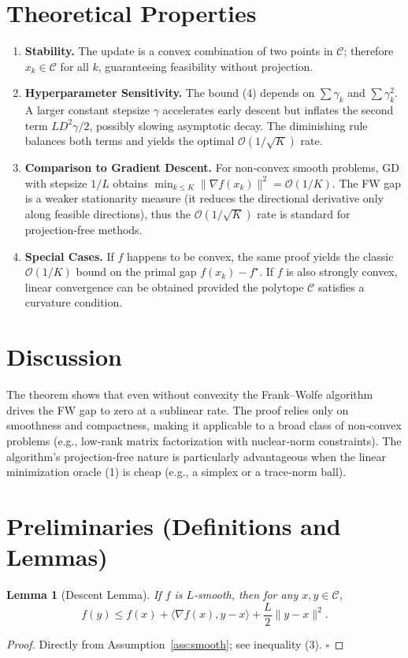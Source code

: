 \documentclass{article}
\newtheorem{lemma}{Lemma}
\newcommand{\grad}{\nabla}
\newcommand{\dom}{\mathcal{C}}
\begin{document}
\section*{Theoretical Properties}
\begin{enumerate}[label=\arabic*.]
\item \textbf{Stability.} The update is a convex combination of two points in $\dom$; therefore $x_{k}\in\dom$ for all $k$, guaranteeing feasibility without projection.
\item \textbf{Hyperparameter Sensitivity.} The bound (4) depends on $\sum\gamma_{k}$ and $\sum\gamma_{k}^{2}$. A larger constant stepsize $\gamma$ accelerates early descent but inflates the second term $L D^{2}\gamma/2$, possibly slowing asymptotic decay. The diminishing rule balances both terms and yields the optimal $\mathcal{O}(1/\sqrt{K})$ rate.
\item \textbf{Comparison to Gradient Descent.} For non‑convex smooth problems, GD with stepsize $1/L$ obtains $\min_{k\le K}\|\grad f(x_{k})\|^{2}= \mathcal{O}(1/K)$. The FW gap is a weaker stationarity measure (it reduces the directional derivative only along feasible directions), thus the $\mathcal{O}(1/\sqrt{K})$ rate is standard for projection‑free methods.
\item \textbf{Special Cases.} If $f$ happens to be convex, the same proof yields the classic $\mathcal{O}(1/K)$ bound on the primal gap $f(x_{k})-f^{\star}$. If $f$ is also strongly convex, linear convergence can be obtained provided the polytope $\dom$ satisfies a curvature condition.
\end{enumerate}

\section*{Discussion}
The theorem shows that even without convexity the Frank–Wolfe algorithm drives the FW gap to zero at a sublinear rate. The proof relies only on smoothness and compactness, making it applicable to a broad class of non‑convex problems (e.g., low‑rank matrix factorization with nuclear‑norm constraints). The algorithm’s projection‑free nature is particularly advantageous when the linear minimization oracle (1) is cheap (e.g., a simplex or a trace‑norm ball).

\section*{Preliminaries (Definitions and Lemmas)}
\begin{lemma}[Descent Lemma]
\label{lem:descent}
If $f$ is $L$‑smooth, then for any $x,y\in\dom$,
\[
f(y)\le f(x)+\langle\grad f(x),y-x\rangle+\frac{L}{2}\|y-x\|^{2}. 
\tag{5}
\]
\end{lemma}
\begin{proof}
Directly from Assumption~\ref{ass:smooth}; see inequality (3). \hfill $\square$
\end{proof}
\end{document}
